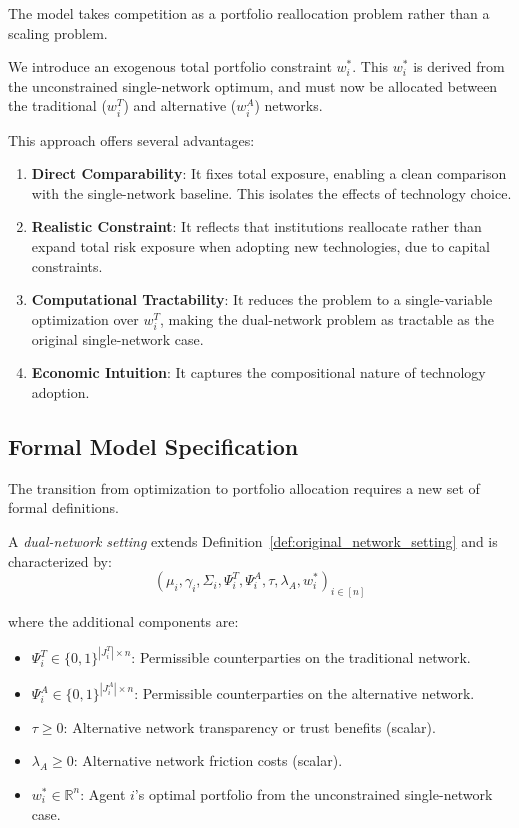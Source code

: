 The model takes competition as a portfolio reallocation problem rather than a scaling problem.

We introduce an exogenous total portfolio constraint $w_i^*$. This $w_i^*$ is derived from the unconstrained single-network optimum, and must now be allocated between the traditional ($w_i^T$) and alternative ($w_i^A$) networks.

This approach offers several advantages:

\begin{enumerate}
    \item \textbf{Direct Comparability}: It fixes total exposure, enabling a clean comparison with the single-network baseline. This isolates the effects of technology choice.
    \item \textbf{Realistic Constraint}: It reflects that institutions reallocate rather than expand total risk exposure when adopting new technologies, due to capital constraints.
    \item \textbf{Computational Tractability}: It reduces the problem to a single-variable optimization over $w_i^T$, making the dual-network problem as tractable as the original single-network case.
    \item \textbf{Economic Intuition}: It captures the compositional nature of technology adoption.
\end{enumerate}

\subsection{Formal Model Specification}
\label{sec:formal_spec}

The transition from optimization to portfolio allocation requires a new set of formal definitions.

\begin{definition}
\label{def:dual_network_setting}
A \textit{dual-network setting} extends Definition~\ref{def:original_network_setting} and is characterized by:
$$(\mu_i, \gamma_i, \Sigma_i, \Psi_i^T, \Psi_i^A, \tau, \lambda_A, w_i^*)_{i \in [n]}$$

where the additional components are:
\begin{itemize}
    \item $\Psi_i^T \in \{0,1\}^{|J_i^T| \times n}$: Permissible counterparties on the traditional network.
    \item $\Psi_i^A \in \{0,1\}^{|J_i^A| \times n}$: Permissible counterparties on the alternative network.
    \item $\tau \geq 0$: Alternative network transparency or trust benefits (scalar).
    \item $\lambda_A \geq 0$: Alternative network friction costs (scalar).
    \item $w_i^* \in \mathbb{R}^n$: Agent $i$'s optimal portfolio from the unconstrained single-network case.
\end{itemize}
\end{definition}


